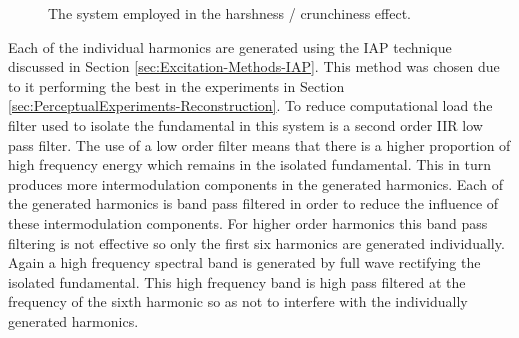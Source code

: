 \begin{figure}[h!]
				\caption{The system employed in the harshness / crunchiness effect.}
				\label{fig:HarshCrunch}
			\end{figure}

			Each of the individual harmonics are generated using the IAP technique discussed in Section
			\ref{sec:Excitation-Methods-IAP}. This method was chosen due to it performing the best in the
			experiments in Section \ref{sec:PerceptualExperiments-Reconstruction}. To reduce computational load
			the filter used to isolate the fundamental in this system is a second order IIR low pass filter.
			The use of a low order filter means that there is a higher proportion of high frequency energy which
			remains in the isolated fundamental. This in turn produces more intermodulation components in the
			generated harmonics. Each of the generated harmonics is band pass filtered in order to reduce the
			influence of these intermodulation components. For higher order harmonics this band pass filtering
			is not effective so only the first six harmonics are generated individually. Again a high frequency
			spectral band is generated by full wave rectifying the isolated fundamental. This high frequency
			band is high pass filtered at the frequency of the sixth harmonic so as not to interfere with the
			individually generated harmonics.

